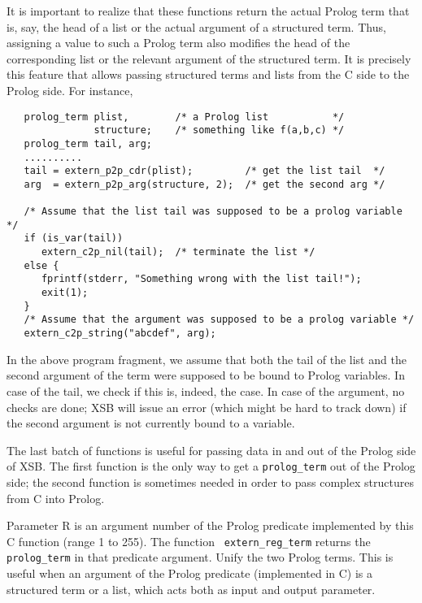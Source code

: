 It is important to realize that these functions return the actual
Prolog term that is, say, the head of a list or the actual argument of
a structured term. Thus, assigning a value to such a Prolog term also
modifies the head of the corresponding list or the relevant argument
of the structured term. It is precisely this feature that allows
passing structured terms and lists from the C side to the Prolog side.
For instance,
\begin{verbatim}
   prolog_term plist,        /* a Prolog list           */
               structure;    /* something like f(a,b,c) */
   prolog_term tail, arg;
   ..........
   tail = extern_p2p_cdr(plist);         /* get the list tail  */
   arg  = extern_p2p_arg(structure, 2);  /* get the second arg */

   /* Assume that the list tail was supposed to be a prolog variable */
   if (is_var(tail))
      extern_c2p_nil(tail);  /* terminate the list */
   else {
      fprintf(stderr, "Something wrong with the list tail!");
      exit(1);
   }
   /* Assume that the argument was supposed to be a prolog variable */
   extern_c2p_string("abcdef", arg);
\end{verbatim}

In the above program fragment, we assume that both the tail of the list and
the second argument of the term were supposed to be bound to Prolog variables.
In case of the tail, we check if this is, indeed, the case. In case of the
argument, no checks are done; XSB will issue an error (which might be hard
to track down) if the second argument is not currently bound to a variable.

The last batch of functions is useful for passing data in and out of the
Prolog side of XSB. The first function is the only way to get a
{\tt prolog\_term} out of the Prolog side; the second function is
sometimes needed in order to pass complex structures from C into Prolog.
\begin{description}
  Parameter R is an argument number of the Prolog predicate
  implemented by this C function (range 1 to 255). The function {\tt
    extern\_reg\_term} returns the {\tt prolog\_term} in that predicate
  argument.  
% 
%
Unify the two Prolog terms. This is useful when an argument of the
Prolog predicate (implemented in C) is a structured term or a list,
which acts both as input and output parameter.
\end{description}

